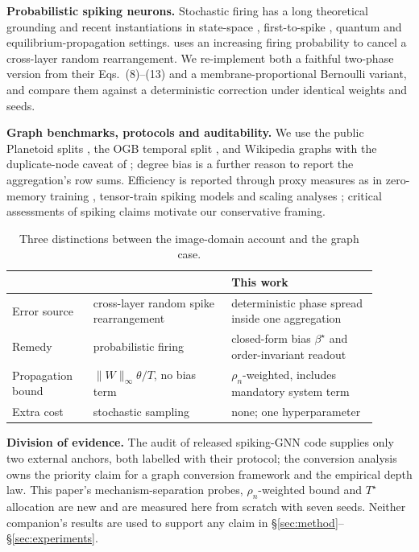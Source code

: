 \documentclass[10pt,twocolumn]{article}
\newcommand{\betastar}{\beta^{\star}}
\newcommand{\Tstar}{T^{\star}}
\newcommand{\rhon}{\rho_n}
\begin{document}
\textbf{Probabilistic spiking neurons.} Stochastic firing has a long theoretical grounding
\cite{probsnn2019,noise2023,lottery2023,stochastic2023} and recent instantiations in state-space
\cite{pspikessm2024}, first-to-spike \cite{firstspike2024}, quantum \cite{quantum2025} and
equilibrium-propagation \cite{stochep2025} settings. \cite{tpp2025} uses an increasing firing
probability to cancel a cross-layer random rearrangement. We re-implement both a faithful
two-phase version from their Eqs.~(8)--(13) and a membrane-proportional Bernoulli variant, and
compare them against a deterministic correction under identical weights and seeds.

\textbf{Graph benchmarks, protocols and auditability.} We use the public Planetoid splits
\cite{planetoid2016,gcn2017}, the OGB temporal split \cite{ogb2020}, and Wikipedia graphs
\cite{musae2019} with the duplicate-node caveat of \cite{heterophily2023}; degree bias
\cite{degreebias2024} is a further reason to report the aggregation's row sums. Efficiency is
reported through proxy measures as in zero-memory training \cite{zeromem2023}, tensor-train
spiking models \cite{ttsnn2024} and scaling analyses \cite{scaling2026}; critical assessments of
spiking claims \cite{critique2025} motivate our conservative framing.

\begin{table}[t]
\centering\small
\caption{Three distinctions between the image-domain account and the graph case.}
\label{tab:contrast}
\begin{tabular}{p{0.20\linewidth}p{0.34\linewidth}p{0.36\linewidth}}
\toprule
 & \cite{tpp2025} & This work \\
\midrule
Error source & cross-layer random spike rearrangement & deterministic phase spread inside one aggregation \\
Remedy & probabilistic firing & closed-form bias $\betastar$ and order-invariant readout \\
Propagation bound & $\|W\|_\infty\theta/T$, no bias term & $\rhon$-weighted, includes mandatory system term \\
Extra cost & stochastic sampling & none; one hyperparameter \\
\bottomrule
\end{tabular}
\end{table}

\textbf{Division of evidence.} The audit of released spiking-GNN code \cite{companion} supplies
only two external anchors, both labelled with their protocol; the conversion analysis
\cite{companionb} owns the priority claim for a graph conversion framework and the empirical
depth law. This paper's mechanism-separation probes, $\rhon$-weighted bound and $\Tstar$
allocation are new and are measured here from scratch with seven seeds. Neither companion's
results are used to support any claim in \S\ref{sec:method}--\S\ref{sec:experiments}.
\end{document}
